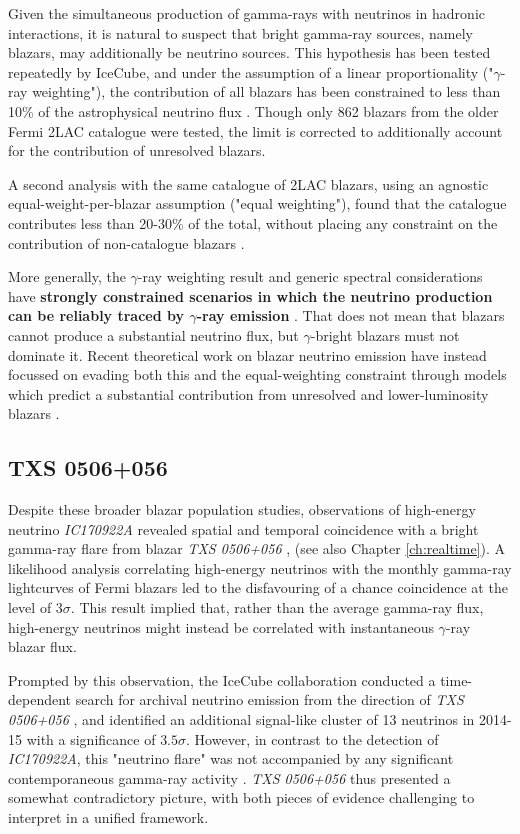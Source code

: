 Given the simultaneous production of gamma-rays with neutrinos in hadronic interactions, it is natural to suspect that bright gamma-ray sources, namely blazars, may additionally be neutrino sources. This hypothesis has been tested repeatedly by IceCube, and under the assumption of a linear proportionality ("$\gamma$-ray weighting"), the contribution of all blazars has been constrained to less than 10\% of the astrophysical neutrino flux . Though only 862 blazars from the older Fermi 2LAC catalogue were tested, the limit is corrected to additionally account for the contribution of unresolved blazars. 

A second analysis with the same catalogue of 2LAC blazars, using an agnostic equal-weight-per-blazar assumption ("equal weighting"), found that the catalogue contributes less than 20-30\% of the total, without placing any constraint on the contribution of non-catalogue blazars \cite{ic_blazar_17}. 

More generally, the $\gamma$-ray weighting result and generic spectral considerations have \textbf{strongly constrained scenarios in which the neutrino production can be reliably traced by $\gamma$-ray emission} . That does not mean that blazars cannot produce a substantial neutrino flux, but $\gamma$-bright blazars must not dominate it. Recent theoretical work on blazar neutrino emission have instead focussed on evading both this and the equal-weighting constraint through models which predict a substantial contribution from unresolved and lower-luminosity blazars .

\subsection*{TXS 0506+056}

Despite these broader blazar population studies, observations of high-energy neutrino \emph{IC170922A} revealed spatial and temporal coincidence with a bright gamma-ray flare from blazar \emph{TXS 0506+056} , (see also Chapter \ref{ch:realtime}). A likelihood analysis correlating high-energy neutrinos with the monthly gamma-ray lightcurves of Fermi blazars led to the disfavouring of a chance coincidence at the level of $3 \sigma$. This result implied that, rather than the average gamma-ray flux, high-energy neutrinos might instead be correlated with instantaneous $\gamma$-ray blazar flux. 

Prompted by this observation, the IceCube collaboration conducted a time-dependent search for archival neutrino emission from the direction of \emph{TXS 0506+056} , and identified an additional signal-like cluster of 13 neutrinos in 2014-15 with a significance of $3.5 \sigma$. However, in contrast to the detection of \emph{IC170922A}, this "neutrino flare" was not accompanied by any significant contemporaneous gamma-ray activity . \emph{TXS 0506+056} thus presented a somewhat contradictory picture, with both pieces of evidence challenging to interpret in a unified framework. 

